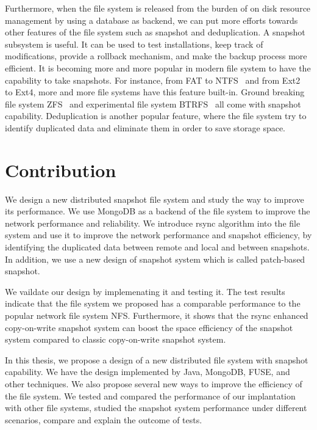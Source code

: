     Furthermore, when the file system is released from the burden of on disk resource management by using a database as backend, we can put more efforts towards other features of the file system such as snapshot and deduplication. A snapshot subsystem is useful. It can be used to test installations, keep track of modifications, provide a rollback mechanism, and make the backup process more efficient. It is becoming more and more popular in modern file system to have the capability to take snapshots. For instance, from FAT to NTFS~\cite{ntfs} and from Ext2~\cite{ext2_wiki} to Ext4, more and more file systems have this feature built-in. Ground breaking file system ZFS~\cite{zfs_wiki} and experimental file system BTRFS~\cite{btrfs} all come with snapshot capability. Deduplication is another popular feature, where the file system try to identify duplicated data and eliminate them in order to save storage space.

\section{Contribution}

    We design a new distributed snapshot file system and study the way to improve its performance. We use MongoDB as a backend of the file system to improve the network performance and reliability. We introduce rsync algorithm into the file system and use it to improve the network performance and snapshot efficiency, by identifying the duplicated data between remote and local and between snapshots. In addition, we use a new design of snapshot system which is called patch-based snapshot. 

    We vaildate our design by implemenating it and testing it. The test results indicate that the file system we proposed has a comparable performance to the popular network file system NFS. Furthermore, it shows that the rsync enhanced copy-on-write snapshot system can boost the space efficiency of the snapshot system compared to classic copy-on-write snapshot system.

    In this thesis, we propose a design of a new distributed file system with snapshot capability. We have the design implemented by Java, MongoDB, FUSE, and other techniques. We also propose several new ways to improve the efficiency of the file system. We tested and compared the performance of our implantation with other file systems, studied the snapshot system performance under different scenarios, compare and explain the outcome of tests.
